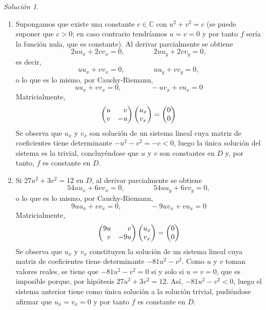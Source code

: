 \documentclass[11pt]{report}
\newcommand{\C}{\mathbb C}
\theoremstyle{remark}
\newtheorem*{resolution}{Solución}
\begin{document}
\begin{resolution}
\begin{enumerate}
    \item Supongamos que existe una constante $c \in \C$ con $u^2+v^2 = c$ (se puede suponer que $c > 0$;  en caso contrario tendríamos $u=v=0$ y por tanto $f$ sería la función nula, que es constante). Al derivar parcialmente se obtiene
    \[2uu_x+2vv_x = 0, \qquad \qquad 2uu_y+2vv_y = 0,\]
    es decir,
    \[uu_x+vv_x = 0, \qquad \qquad uu_y+vv_y = 0,\]
    o lo que es lo mismo, por Cauchy-Riemann,
    \[uu_x+vv_x =0, \qquad \qquad -uv_x+vu_x = 0 \]
    Matricialmente,
    \[\left(\begin{array}{@{}cc@{}}
         u & \phantom{-}v \\
         v & -u 
    \end{array}\right)\left(\begin{array}{@{}c@{}}
         u_x \\
         v_x 
    \end{array}\right) = \left(\begin{array}{@{}c@{}}
         0  \\
         0 
    \end{array}\right)\]
    Se observa que $u_x$ y $v_x$ son solución de un sistema lineal cuya matriz de coeficientes tiene determinante $-u^2-v^2=-c <0$, luego la única solución del sistema es la trivial, concluyéndose que $u$ y $v$ son constantes en $D$ y, por tanto, $f$ es constante en $D$.
    \item Si $27u^2+3v^2 = 12$ en $D$, al derivar parcialmente se obtiene
    \[54uu_x+6vv_x = 0, \qquad \qquad 54uu_y+6vv_y = 0,\]
    o lo que es lo mismo, por Cauchy-Riemann,
    \[9uu_x+vv_x = 0, \qquad \qquad -9uv_x+vu_x = 0\]
    Matricialmente,
    \[\left(\begin{array}{@{}cc@{}}
         9u & \phantom{-9}v \\
         \phantom{9}v & -9u 
    \end{array}\right)\left(\begin{array}{@{}c@{}}
         u_x \\
         v_x 
    \end{array}\right) = \left(\begin{array}{@{}c@{}}
         0  \\
         0 
    \end{array}\right)\]
    Se observa que $u_x$ y $v_x$ constituyen la solución de un sistema lineal cuya matriz de coeficientes tiene determinante $-81u^2-v^2$. Como $u$ y $v$ toman valores reales, se tiene que $-81u^2-v^2 = 0$ si y solo si $u = v = 0$, que es imposible porque, por hipótesis $27u^2+3v^2 = 12$. Así, $-81u^2-v^2<0$, luego el sistema anterior tiene como única solución a la solución trivial, pudiéndose afirmar que $u_x=v_x = 0$ y por tanto $f$ es constante en $D$.
\end{enumerate}
\end{resolution}
\end{document}

